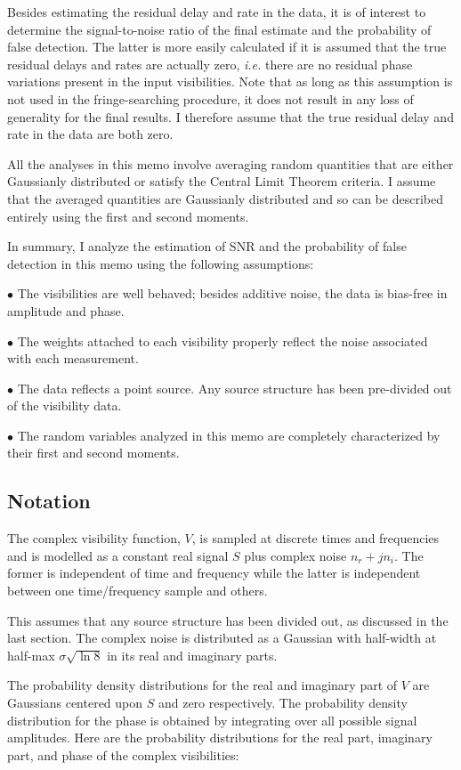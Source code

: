 Besides estimating the residual delay and rate in the data, it is of
interest to determine the signal-to-noise ratio of the final estimate and
the probability of false detection.  The latter is more easily
calculated if it is assumed that the true residual delays and rates
are actually zero, {\it i.e.}  there are no residual phase variations
present in the input visibilities.  Note that as long as this
assumption is not used in the fringe-searching procedure, it does not
result in any loss of generality for the final results.  I therefore
assume that the true residual delay and rate in the data are both
zero.

All the analyses in this memo involve averaging random quantities that
are either Gaussianly distributed or satisfy the Central Limit Theorem
criteria.  I assume that the averaged quantities are Gaussianly
distributed and so can be described entirely using the first and
second moments.

In summary, I analyze the estimation of SNR and the probability of
false detection in this memo using the following assumptions:

$\bullet$ The visibilities are well behaved; besides additive noise,
the data is bias-free in amplitude and phase.

$\bullet$ The weights attached to each visibility properly reflect the
noise associated with each measurement.

$\bullet$ The data reflects a point source.  Any source structure has
been pre-divided out of the visibility data.

$\bullet$ The random variables analyzed in this memo are completely
characterized by their first and second moments.

\subsection{Notation}

The complex visibility function, $V$, is sampled at discrete times and
frequencies and is modelled as a constant real signal $S$ plus
complex noise $n_r + jn_i$.  The former is independent of time and
frequency while the latter is independent between one time/frequency
sample and others.

This assumes that any source structure has been divided out, as
discussed in the last section.  The complex noise is distributed as a
Gaussian with half-width at half-max $\sigma\sqrt{\ln{8}}$ in its real and
imaginary parts.

The probability density distributions for the real and imaginary part
of $V$ are Gaussians centered upon $S$ and zero respectively.  The
probability density distribution for the phase is obtained by
integrating over all possible signal amplitudes.  Here are the
probability distributions for the real part, imaginary part, and phase
of the complex visibilities:

